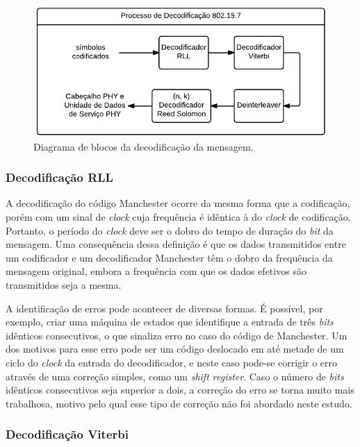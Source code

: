 	\begin{figure}[!htb]
		\caption{\label{fig_reception_phy1}Diagrama de blocos da decodificação da mensagem.}
		\centering
		\includegraphics[width=0.4\textheight]{PHY1-reception.pdf}
	\end{figure}

	\subsubsection{Decodificação RLL}

	A decodificação do código Manchester ocorre da mesma forma que a codificação, porém com um sinal de \textit{clock} cuja frequência é idêntica à do \textit{clock} de codificação. Portanto, o período do \textit{clock} deve ser o dobro do tempo de duração do \textit{bit} da mensagem. Uma consequência dessa definição é que os dados transmitidos entre um codificador e um decodificador Manchester têm o dobro da frequência da mensagem original, embora a frequência com que os dados efetivos são transmitidos seja a mesma.

	A identificação de erros pode acontecer de diversas formas. É possível, por exemplo, criar uma máquina de estados que identifique a entrada de três \textit{bits} idênticos consecutivos, o que sinaliza erro no caso do código de Manchester. Um dos motivos para esse erro pode ser um código deslocado em até metade de um ciclo do \textit{clock} da entrada do decodificador, e neste caso pode-se corrigir o erro através de uma correção simples, como um \textit{shift register}. Caso o número de \textit{bits} idênticos consecutivos seja superior a dois, a correção do erro se torna muito mais trabalhosa, motivo pelo qual esse tipo de correção não foi abordado neste estudo.

	\subsubsection{Decodificação Viterbi}\label{section:method-viterbi}

